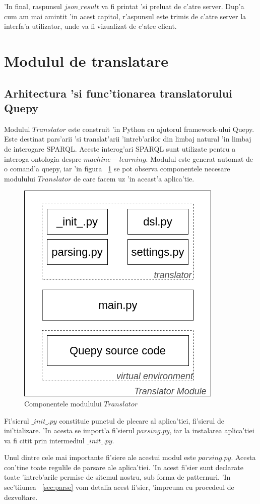 \documentclass[12pt,a4paper,twoside]{report}
\begin{document}
'In final, raspunsul $json\_result$ va fi printat 'si preluat de c'atre server. Dup'a cum am mai amintit 'in acest capitol, r'aspunsul este trimis de c'atre server la interfa'a utilizator, unde va fi vizualizat de c'atre client.


\section{Modulul de translatare}
\subsection{Arhitectura 'si func'tionarea translatorului Quepy}

Modulul $Translator$ este construit 'in Python cu ajutorul framework-ului Quepy. Este destinat pars'arii 'si translat'arii 'intreb'arilor din limbaj natural 'in limbaj de interogare SPARQL. Aceste interog'ari SPARQL sunt utilizate pentru a interoga ontologia despre $machine-learning$. Modulul este generat automat de o comand'a quepy, iar 'in figura ~\ref{fig:quepy_files} se pot observa componentele necesare modulului $Translator$ de care facem uz 'in aceast'a aplica'tie. 
\begin{figure}
    \centering
    \includegraphics[width = 0.5\linewidth]{img/quepy_schema.png}
    \caption{Componentele modulului $Translator$}
    \label{fig:quepy_files}
\end{figure}

Fi'sierul $\_init\_.py$ constituie punctul de plecare al aplica'tiei, fi'sierul de ini'tializare. 'In acesta se import'a fi'sierul $parsing.py$, iar la instalarea aplica'tiei va fi citit prin intermediul $\_init\_.py$. 

Unul dintre cele mai importante fi'siere ale acestui modul este $parsing.py$. Acesta con'tine toate regulile de parsare ale aplica'tiei. 'In acest fi'sier sunt declarate toate 'intreb'arile permise de sitemul nostru, sub forma de patternuri. 'In sec'tiiunea ~\ref{sec:parse} vom detalia acest fi'sier, 'impreuna cu procedeul de dezvoltare.
\end{document}
